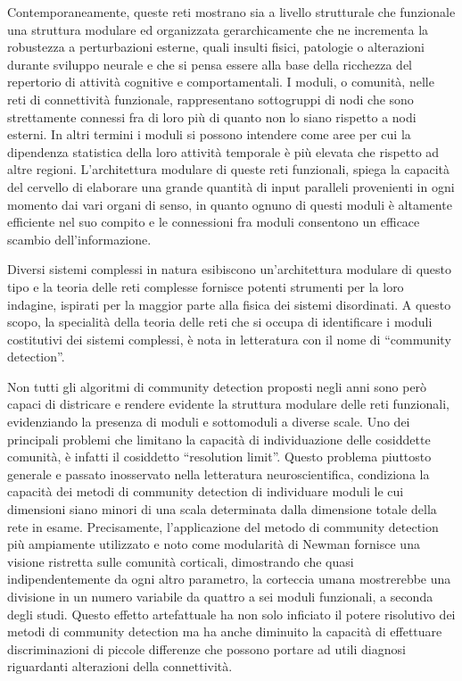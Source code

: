 Contemporaneamente, queste reti mostrano sia a livello strutturale che funzionale una struttura modulare ed organizzata gerarchicamente che ne incrementa la robustezza a perturbazioni esterne, quali insulti fisici, patologie o alterazioni durante sviluppo neurale e che si pensa essere alla base della ricchezza del repertorio di attività cognitive e comportamentali.
I moduli, o comunità, nelle reti di connettività funzionale, rappresentano sottogruppi di nodi che sono strettamente connessi fra di loro più di quanto non lo siano rispetto a nodi esterni.
In altri termini i moduli si possono intendere come aree per cui la dipendenza statistica della loro attività temporale è più elevata che rispetto ad altre regioni.
L'architettura modulare di queste reti funzionali, spiega la capacità del cervello di elaborare una grande quantità di input paralleli provenienti in ogni momento dai vari organi di senso, in quanto ognuno di questi moduli è altamente efficiente nel suo compito e le connessioni fra moduli consentono un efficace scambio dell'informazione. 

Diversi sistemi complessi in natura esibiscono un'architettura modulare di questo tipo e la teoria delle reti complesse fornisce potenti strumenti per la loro indagine, ispirati per la maggior parte alla fisica dei sistemi disordinati.
A questo scopo, la specialità della teoria delle reti che si occupa di identificare i moduli costitutivi dei sistemi complessi, è nota in letteratura con il nome di ``community detection''.

Non tutti gli algoritmi di community detection proposti negli anni sono però capaci di districare e rendere evidente la struttura modulare delle reti funzionali, evidenziando la presenza di moduli e sottomoduli a diverse scale.
Uno dei principali problemi che limitano la capacità di individuazione delle cosiddette comunità, è infatti il cosiddetto ``resolution limit''.
Questo problema piuttosto generale e passato inosservato nella letteratura neuroscientifica, condiziona la capacità dei metodi di community detection di individuare moduli le cui dimensioni siano minori di una scala determinata dalla dimensione totale della rete in esame.
Precisamente, l'applicazione del metodo di community detection più ampiamente utilizzato e noto come modularità di Newman fornisce una visione ristretta sulle comunità corticali, dimostrando che quasi indipendentemente da ogni altro parametro, la corteccia umana mostrerebbe una divisione in un numero variabile da quattro a sei moduli funzionali, a seconda degli studi.
Questo effetto artefattuale ha non solo inficiato il potere risolutivo dei metodi di community detection ma ha anche diminuito la capacità di effettuare discriminazioni di piccole differenze che possono portare ad utili diagnosi riguardanti alterazioni della connettività.

